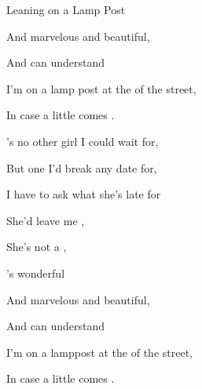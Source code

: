 \begin{SBSong}{Leaning on a Lamp Post}
\begin{SBVerse}
    And marvelous and beautiful,

    And  can understand 

    I'm  on a lamp post at the  of the street,

    In case a  little  comes .
  \end{SBVerse}  
  \ifChordBk
    \begin{SBVerse}
      's no other girl I could wait for,

      But  one I'd break any date for,
    
      I  have to ask what she's late for

      She'd   leave me , 

      She's not a     ,

      's  wonderful

      And marvelous and beautiful,

      And  can understand 

      I'm  on a lamppost at the  of the street,

      In case a  little  comes .
    \end{SBVerse} 
  \fi
\end{SBSong}
